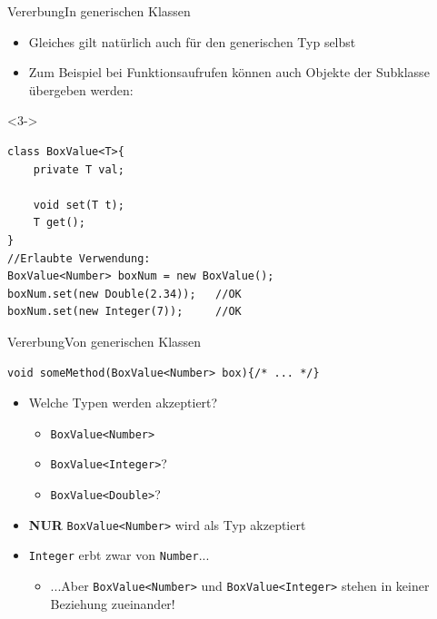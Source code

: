 \begin{frame}[fragile]{Vererbung}{In generischen Klassen}
    \begin{itemize}
        \item Gleiches gilt natürlich auch für den generischen Typ selbst
        \item<2-> Zum Beispiel bei Funktionsaufrufen können auch Objekte der Subklasse übergeben werden:
    \end{itemize}
    \lstset{style=java}
    \begin{onlyenv}<3->
    \begin{lstlisting}
class BoxValue<T>{
    private T val;
    
    void set(T t);
    T get();
}
//Erlaubte Verwendung:
BoxValue<Number> boxNum = new BoxValue();
boxNum.set(new Double(2.34));   //OK
boxNum.set(new Integer(7));     //OK
    \end{lstlisting}
    \end{onlyenv}
\end{frame}

\begin{frame}[fragile]{Vererbung}{Von generischen Klassen}
\lstset{style=java}
\begin{lstlisting}
void someMethod(BoxValue<Number> box){/* ... */}
\end{lstlisting}
\begin{itemize}
    \item<2-> Welche Typen werden akzeptiert?
    \begin{itemize}
        \item<3-> \texttt{BoxValue<Number>}
        \item<4-> \texttt{BoxValue<Integer>}?
        \item<5-> \texttt{BoxValue<Double>}?
    \end{itemize}
    \item<6-> \textbf{NUR} \texttt{BoxValue<Number>} wird als Typ akzeptiert
    \item<7-> \texttt{Integer} erbt zwar von \texttt{Number}...
    \begin{itemize}
        \item<8-> ...Aber \texttt{BoxValue<Number>} und \texttt{BoxValue<Integer>} stehen in keiner Beziehung zueinander!
    \end{itemize}
\end{itemize}
\end{frame}

